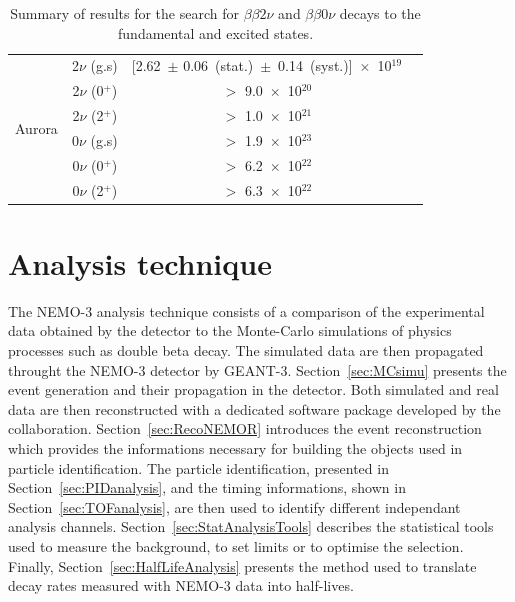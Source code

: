 \documentclass[main.tex]{subfiles}
\begin{document}
\begin{table}[h!]
\begin{center}
\begin{tabular}{c|c|c|c}
\hline

\multirow{6}{*}{Aurora} & 2$\nu$ (g.s) & [2.62~$\pm$ 0.06~(stat.)~$\pm$~0.14~(syst.)]~$\times$~10$^{\text{19}}$& \multirow{6}{*}{\cite{Aurora}}\\[0.1cm]
                        & 2$\nu$ (0$^+$) & $>$ 9.0~$\times$~10$^{\text{20}}$&\\[0.1cm]
                        & 2$\nu$ (2$^+$) & $>$ 1.0~$\times$~10$^{\text{21}}$&\\[0.1cm]
                        & 0$\nu$ (g.s)   & $>$ 1.9~$\times$~10$^{\text{23}}$&\\[0.1cm]
                        & 0$\nu$ (0$^+$) & $>$ 6.2~$\times$~10$^{\text{22}}$&\\[0.1cm]
                        & 0$\nu$ (2$^+$) & $>$ 6.3~$\times$~10$^{\text{22}}$&\\[0.1cm]
\bottomrule
\end{tabular}
\caption{Summary of results for the search for $\beta \beta 2\nu$ and $\beta \beta 0\nu$ decays to the fundamental and excited states.}
\label{TableSummaryResultsFS}
\end{center}
\end{table}


\FloatBarrier

\clearpage

\section{Analysis technique}\label{sec:AnalysisTechnique}


\NI The NEMO-3 analysis technique consists of a comparison of the experimental data obtained by the detector to the Monte-Carlo simulations of physics processes such as double beta decay. The simulated data are then propagated throught the NEMO-3 detector by GEANT-3. Section~\ref{sec:MCsimu} presents the event generation and their propagation in the detector. Both simulated and real data are then reconstructed with a dedicated software package developed by the collaboration. Section~\ref{sec:RecoNEMOR} introduces the event reconstruction which provides the informations necessary for building the objects used in particle identification. The particle identification, presented in Section~\ref{sec:PIDanalysis}, and the timing informations, shown in Section~\ref{sec:TOFanalysis}, are then used to identify different independant analysis channels. Section~\ref{sec:StatAnalysisTools} describes the statistical tools used to measure the background, to set limits or to optimise the selection. Finally, Section~\ref{sec:HalfLifeAnalysis} presents the method used to translate decay rates measured with NEMO-3 data into half-lives.
\end{document}
